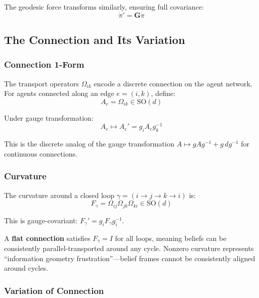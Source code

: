 \documentclass[12pt]{article}
\begin{document}
The geodesic force transforms similarly, ensuring full covariance:
\begin{equation}
\boxed{\dot{\pi}' = \mathbf{G}\dot{\pi}}
\end{equation}

\subsection{The Connection and Its Variation}

\subsubsection{Connection 1-Form}

The transport operators $\Omega_{ik}$ encode a discrete connection on the agent network. For agents connected along an edge $e = (i,k)$, define:
\begin{equation}
A_e = \Omega_{ik} \in \mathrm{SO}(d)
\end{equation}

Under gauge transformation:
\begin{equation}
A_e \mapsto A_e' = g_i A_e g_k^{-1}
\end{equation}

This is the discrete analog of the gauge transformation $A \mapsto gAg^{-1} + g\,dg^{-1}$ for continuous connections.

\subsubsection{Curvature}

The curvature around a closed loop $\gamma = (i \to j \to k \to i)$ is:
\begin{equation}
F_\gamma = \Omega_{ij}\Omega_{jk}\Omega_{ki} \in \mathrm{SO}(d)
\end{equation}

This is gauge-covariant: $F_\gamma' = g_i F_\gamma g_i^{-1}$.

A \textbf{flat connection} satisfies $F_\gamma = I$ for all loops, meaning beliefs can be consistently parallel-transported around any cycle. Nonzero curvature represents ``information geometry frustration''---belief frames cannot be consistently aligned around cycles.

\subsubsection{Variation of Connection}
\end{document}
